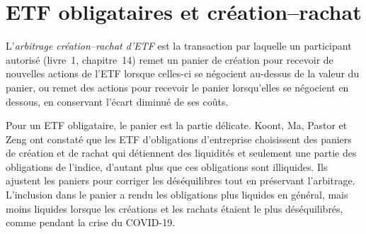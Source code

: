 \begin{omfigure}

\label{fig:s2:systematic-credit-and-bond-etf-arbitrage:factors}
\end{omfigure}

\section{ETF obligataires et création--rachat}

\begin{definition}\label{def:s2:systematic-credit-and-bond-etf-arbitrage:createredeem}
L'\emph{arbitrage création--rachat d'ETF} est la transaction par laquelle un participant autorisé (livre~1, chapitre~14) remet un
panier de création pour recevoir de nouvelles actions de l'ETF lorsque celles-ci se négocient au-dessus de la valeur du panier, ou remet des actions pour recevoir le panier lorsqu'elles se négocient
en dessous, en conservant l'écart diminué de ses coûts.
\end{definition}

Pour un ETF obligataire, le panier est la partie délicate. Koont, Ma, Pastor et Zeng ont constaté que les ETF d'obligations d'entreprise choisissent des paniers de création et de rachat qui détiennent
des liquidités et seulement une partie des obligations de l'indice, d'autant plus que ces obligations sont illiquides. Ils ajustent les paniers pour corriger les déséquilibres tout en
préservant l'arbitrage.
L'inclusion dans le panier a rendu les obligations plus liquides en général, mais moins liquides lorsque les créations et les rachats étaient le plus déséquilibrés, comme pendant la crise du COVID-19.

